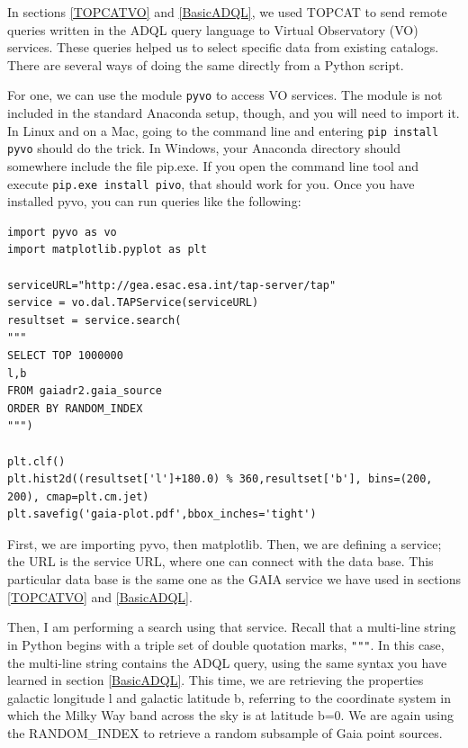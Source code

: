 \documentclass[twocolumn,apj]{openjournal}
\begin{document}
In sections \ref{TOPCATVO} and \ref{BasicADQL}, we used TOPCAT to send remote queries written in the ADQL query language to Virtual Observatory (VO) services. These queries helped us to select specific data from existing catalogs. There are several ways of doing the same directly from a Python script.

For one, we can use the module \verb|pyvo| to access VO services. The module is not included in the standard Anaconda setup, though, and you will need to import it. In Linux and on a Mac, going to the command line and entering \verb|pip install pyvo| should do the trick. In Windows, your Anaconda directory should somewhere include the file pip.exe. If you open the command line tool and execute \verb|pip.exe install pivo|, that should work for you. Once you have installed pyvo, you can run queries like the following:
\begin{lstlisting}
import pyvo as vo
import matplotlib.pyplot as plt

serviceURL="http://gea.esac.esa.int/tap-server/tap"
service = vo.dal.TAPService(serviceURL)
resultset = service.search(
"""
SELECT TOP 1000000 
l,b
FROM gaiadr2.gaia_source
ORDER BY RANDOM_INDEX
""")

plt.clf()
plt.hist2d((resultset['l']+180.0) % 360,resultset['b'], bins=(200, 200), cmap=plt.cm.jet)
plt.savefig('gaia-plot.pdf',bbox_inches='tight')
\end{lstlisting}  
First, we are importing pyvo, then matplotlib. Then, we are defining a service; the URL is the service URL, where one can connect with the data base. This particular data base is the same one as the GAIA service we have used in sections \ref{TOPCATVO} and \ref{BasicADQL}. 

Then, I am performing a search using that service. Recall that a multi-line string in Python begins with a triple set of double quotation marks, \verb|"""|.  In this case, the multi-line string contains the ADQL query, using the same syntax you have learned in section \ref{BasicADQL}. This time, we are retrieving the properties galactic longitude l and galactic latitude b, referring to the coordinate system in which the Milky Way band across the sky is at latitude b=0. We are again using the RANDOM\_INDEX to retrieve a random subsample of Gaia point sources.
\end{document}
